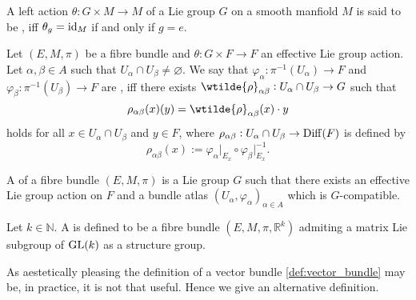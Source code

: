 \begin{definition}
	A left action $\theta : G \times M \to M$ of a Lie group $G$ on a smooth manfiold $M$ is said to be , iff $\theta_g = \operatorname{id}_M$ if and only if $g = e$.
\end{definition}

\begin{definition}[Compatibility]
	Let $(E,M,\pi)$ be a fibre bundle and $\theta : G \times F \to F$ an effective Lie group action. Let $\alpha,\beta \in A$ such that $U_\alpha \cap U_\beta \neq \varnothing$. We say that $\varphi_\alpha : \pi^{-1}(U_\alpha) \to F$ and $\varphi_\beta : \pi^{-1}(U_\beta) \to F$ are , iff there exists $\wtilde{\rho}_{\alpha\beta} : U_\alpha \cap U_\beta \to G$ such that
	\begin{equation*}
		\rho_{\alpha\beta}(x)(y) = \wtilde{\rho}_{\alpha\beta}(x)\cdot y
	\end{equation*}
	\noindent holds for all $x \in U_\alpha \cap U_\beta$ and $y \in F$, where $\rho_{\alpha\beta} : U_\alpha \cap U_\beta \to \operatorname{Diff}(F)$ is defined by
	\begin{equation*}
		\rho_{\alpha\beta}(x) := \varphi_\alpha\vert_{E_x} \circ \varphi_\beta\vert_{E_x}^{-1}.
	\end{equation*}
\end{definition}

\begin{definition}
	A  of a fibre bundle $(E,M,\pi)$ is a Lie group $G$ such that there exists an effective Lie group action on $F$ and a bundle atlas $(U_\alpha,\varphi_\alpha)_{\alpha \in A}$ which is $G$-compatible.
\end{definition}

\begin{definition}
	\label{def:vector_bundle}
	Let $k \in \mathbb{N}$. A  is defined to be a fibre bundle $(E,M,\pi,\mathbb{R}^k)$ admiting a matrix Lie subgroup of $\operatorname{GL}(k)$ as a structure group.
\end{definition}

As aestetically pleasing the definition of a vector bundle \ref{def:vector_bundle} may be, in practice, it is not that useful. Hence we give an alternative definition.

